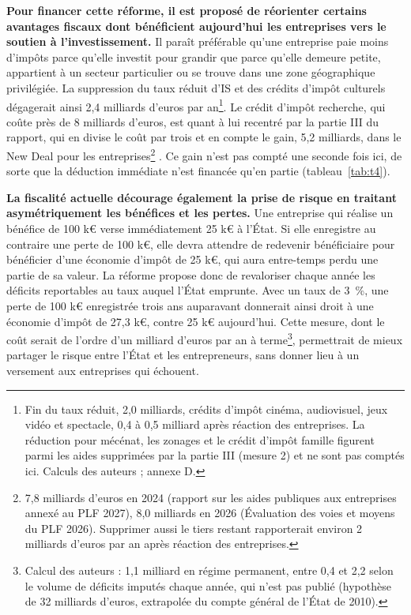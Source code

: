 \documentclass[10pt,a4paper]{article}
\begin{document}

\textbf{Pour financer cette réforme, il est proposé de réorienter certains avantages fiscaux dont bénéficient aujourd’hui les entreprises vers le soutien à l’investissement.} Il paraît préférable qu’une entreprise paie moins d’impôts parce qu’elle investit pour grandir que parce qu’elle demeure petite, appartient à un secteur particulier ou se trouve dans une zone géographique privilégiée. La suppression du taux réduit d’IS et des crédits d’impôt culturels dégagerait ainsi 2,4 milliards d’euros par an\footnote{Fin du taux réduit, 2,0 milliards, crédits d'impôt cinéma, audiovisuel, jeux vidéo et spectacle, 0,4 à 0,5 milliard après réaction des entreprises. La réduction pour mécénat, les zonages et le crédit d'impôt famille figurent parmi les aides supprimées par la partie III (mesure 2) et ne sont pas comptés ici. Calculs des auteurs ; annexe D.}. Le crédit d’impôt recherche, qui coûte près de 8 milliards d’euros, est quant à lui recentré par la partie III du rapport, qui en divise le coût par trois et en compte le gain, 5,2 milliards, dans le New Deal pour les entreprises\footnote{7,8 milliards d'euros en 2024 (rapport sur les aides publiques aux entreprises annexé au PLF 2027), 8,0 milliards en 2026 (Évaluation des voies et moyens du PLF 2026). Supprimer aussi le tiers restant rapporterait environ 2 milliards d'euros par an après réaction des entreprises.} . Ce gain n’est pas compté une seconde fois ici, de sorte que la déduction immédiate n’est financée qu’en partie (tableau~\ref{tab:t4}).

\textbf{La fiscalité actuelle décourage également la prise de risque en traitant asymétriquement les bénéfices et les pertes.} Une entreprise qui réalise un bénéfice de 100 k€ verse immédiatement 25 k€ à l’État. Si elle enregistre au contraire une perte de 100 k€, elle devra attendre de redevenir bénéficiaire pour bénéficier d’une économie d’impôt de 25 k€, qui aura entre-temps perdu une partie de sa valeur. La réforme propose donc de revaloriser chaque année les déficits reportables au taux auquel l’État emprunte. Avec un taux de 3~\%, une perte de 100 k€ enregistrée trois ans auparavant donnerait ainsi droit à une économie d’impôt de 27,3 k€, contre 25 k€ aujourd’hui. Cette mesure, dont le coût serait de l’ordre d’un milliard d’euros par an à terme\footnote{Calcul des auteurs : 1,1 milliard en régime permanent, entre 0,4 et 2,2 selon le volume de déficits imputés chaque année, qui n'est pas publié (hypothèse de 32 milliards d'euros, extrapolée du compte général de l'État de 2010).}, permettrait de mieux partager le risque entre l’État et les entrepreneurs, sans donner lieu à un versement aux entreprises qui échouent.
\end{document}
